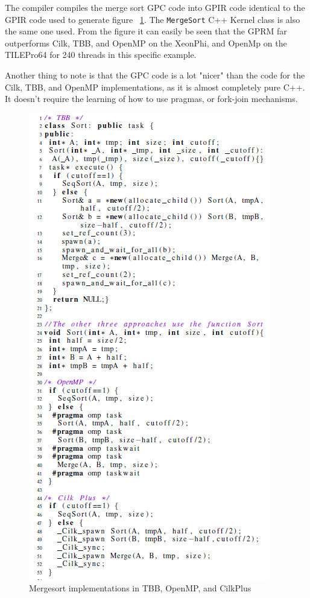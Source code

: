 The compiler compiles the merge sort GPC code into GPIR code identical to the GPIR code used to generate figure ~\ref{fig:bench}.
The \texttt{MergeSort} C++ Kernel class is also the same one used. From the figure it can easily be seen that the GPRM
far outperforms Cilk, TBB, and OpenMP on the XeonPhi, and OpenMp on the TILEPro64 for 240 threads in this specific example. 

Another thing to note is that the GPC code is a lot "nicer" than the code for the Cilk, TBB, and OpenMP
implementations, as it is almost completely pure C++.  It doesn't require the learning of how to use pragmas, 
or fork-join mechanisms.

\begin{figure}[!htb]
\includegraphics{graphs/mergebad.png}
\caption{Mergesort implementations in TBB, OpenMP, and CilkPlus \cite{GPRMBench}}
\label{fig:bench}
\end{figure}



